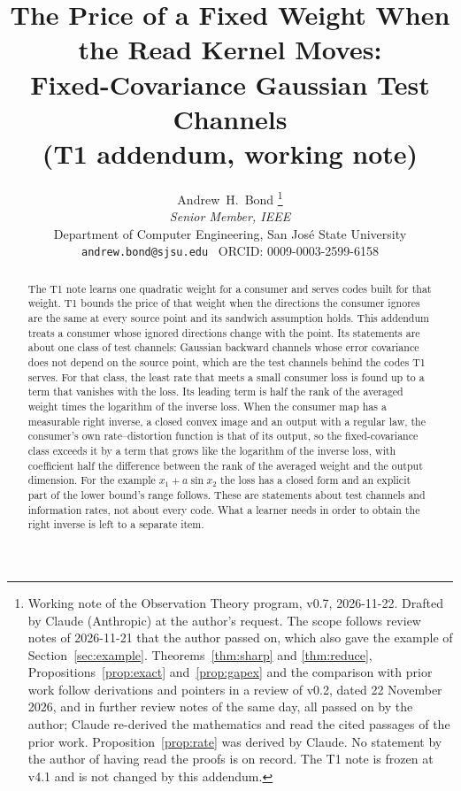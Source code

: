 \documentclass[11pt,onecolumn]{IEEEtran}
\begin{document}
\title{The Price of a Fixed Weight When the Read Kernel Moves:\\ Fixed-Covariance
Gaussian Test Channels\\ (T1 addendum, working note)}
\author{Andrew~H.~Bond%
\thanks{Working note of the Observation Theory program, v0.7, 2026-11-22. Drafted by
Claude (Anthropic) at the author's request. The scope follows review notes of
2026-11-21 that the author passed on, which also gave the example of
Section~\ref{sec:example}. Theorems~\ref{thm:sharp} and \ref{thm:reduce}, Propositions~\ref{prop:exact}
and~\ref{prop:gapex} and the comparison with prior work follow derivations and pointers
in a review of v0.2, dated 22 November 2026, and in further review notes of the same
day, all passed on by the author; Claude re-derived the mathematics and read the cited
passages of the prior work. Proposition~\ref{prop:rate} was derived by Claude. No statement by the author of having read the proofs is on
record. The T1 note \cite{t1} is frozen at v4.1 and is not changed by this
addendum.}\\
\emph{Senior Member, IEEE}\\
Department of Computer Engineering, San Jos\'e State University\\
\texttt{andrew.bond@sjsu.edu} \textbar\ ORCID: 0009-0003-2599-6158}
\maketitle

\begin{abstract}
The T1 note learns one quadratic weight for a consumer and serves codes built for that
weight. T1 bounds the price of that weight when the directions the consumer ignores are
the same at every source point and its sandwich assumption holds. This addendum treats a
consumer whose ignored directions change with the point. Its statements are about one
class of test channels: Gaussian backward channels whose error covariance does not depend
on the source point, which are the test channels behind the codes T1 serves. For that
class, the least rate that meets a small consumer loss is found up to a term that vanishes
with the loss. Its leading term is half the rank of the averaged weight times the
logarithm of the inverse loss. When the consumer map has a measurable right inverse, a
closed convex image and an output with a regular law, the consumer's own
rate--distortion function is that of its output, so the fixed-covariance class exceeds it
by a term that grows like the logarithm of the inverse loss, with coefficient half the
difference between the rank of the averaged weight and the output dimension. For the
example $x_1+a\sin x_2$ the loss has a closed form and an explicit part of the lower bound's
range follows. These are statements about test channels and information rates, not about every
code. What a learner needs in order to obtain the right inverse is left to a separate
item.
\end{abstract}
\end{document}
